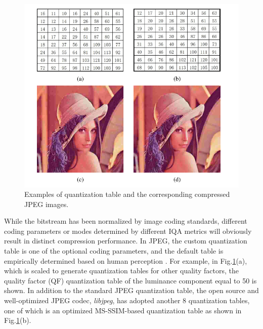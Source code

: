 \begin{figure}[H]
  \includegraphics[width=\linewidth]{figures/jpeg.png}
  \captionsetup{justification=raggedright}
  \caption{Examples of quantization table and the corresponding compressed
    JPEG images.} 
  \label{fig:jpeg}
  
\end{figure}

While the bitstream has been normalized by image coding standards, different coding parameters or modes determined by different IQA metrics will obviously result in distinct compression performance. In JPEG, the custom quantization table is one of the optional coding parameters, and the default table is empirically determined based on human perception \cite{Wallace1992}. For example, in Fig.\ref{fig:jpeg}(a), which is scaled to generate quantization tables for other quality factors, the quality factor (QF) quantization table of the luminance component equal to 50 is shown. In addition to the standard JPEG quantization table, the open source and well-optimized JPEG codec, \emph{libjpeg}, has adopted another 8 quantization tables, one of which is an optimized MS-SSIM-based quantization table as shown in Fig.\ref{fig:jpeg}(b). 

